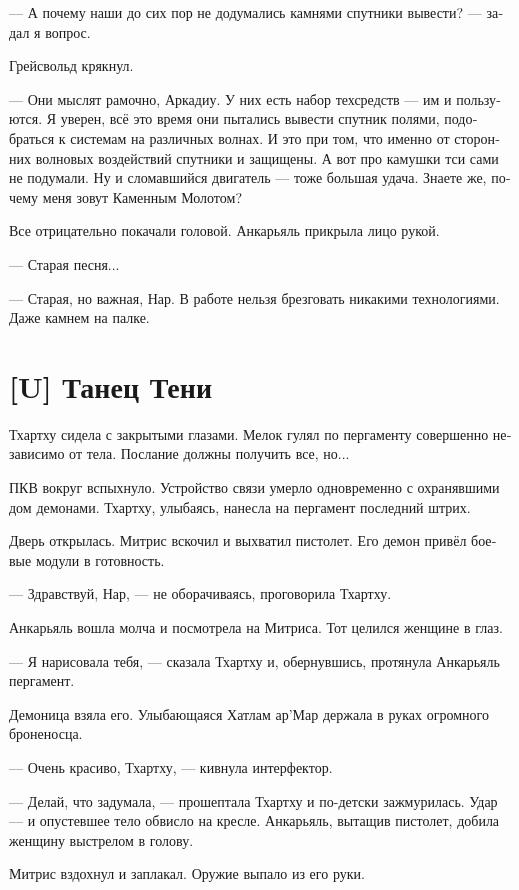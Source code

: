 \documentclass[a4paper,12pt,fleqn]{book}\usepackage{polyglossia}\setdefaultlanguage[babelshorthands=true]{russian}\setotherlanguage{english}\defaultfontfeatures{Ligatures=TeX,Mapping=tex-text}\usepackage{xcolor}\newcommand{\ml}[3]{#2}
\newcommand{\textspace}{\vspace{1em}{\centering\Large\bfseries<...>\par}\vspace{1em}}
\begin{document}
--- А почему наши до сих пор не додумались камнями спутники вывести? --- задал я вопрос.

Грейсвольд крякнул.

--- Они мыслят рамочно, Аркадиу.
У них есть набор техсредств --- им и пользуются.
Я уверен, всё это время они пытались вывести спутник полями, подобраться к системам на различных волнах.
И это при том, что именно от сторонних волновых воздействий спутники и защищены.
А вот про камушки тси сами не подумали.
Ну и сломавшийся двигатель --- тоже большая удача.
Знаете же, почему меня зовут Каменным Молотом?

Все отрицательно покачали головой.
Анкарьяль прикрыла лицо рукой.

--- Старая песня...

--- Старая, но важная, Нар.
В работе нельзя брезговать никакими технологиями.
Даже камнем на палке.

\section{[U] Танец Тени}

\textspace

Тхартху сидела с закрытыми глазами.
Мелок гулял по пергаменту совершенно независимо от тела.
Послание должны получить все, но...

ПКВ вокруг вспыхнуло.
Устройство связи умерло одновременно с охранявшими дом демонами.
Тхартху, улыбаясь, нанесла на пергамент последний штрих.

Дверь открылась.
Митрис вскочил и выхватил пистолет.
Его демон привёл боевые модули в готовность.

--- Здравствуй, Нар, --- не оборачиваясь, проговорила Тхартху.

Анкарьяль вошла молча и посмотрела на Митриса.
Тот целился женщине в глаз.

--- Я нарисовала тебя, --- сказала Тхартху и, обернувшись, протянула Анкарьяль пергамент.

Демоница взяла его.
Улыбающаяся Хатлам ар’Мар держала в руках огромного броненосца.

--- Очень красиво, Тхартху, --- кивнула интерфектор.

--- Делай, что задумала, --- прошептала Тхартху и по-детски зажмурилась.
Удар --- и опустевшее тело обвисло на кресле.
Анкарьяль, вытащив пистолет, добила женщину выстрелом в голову.

Митрис вздохнул и заплакал.
Оружие выпало из его руки.
\end{document}
